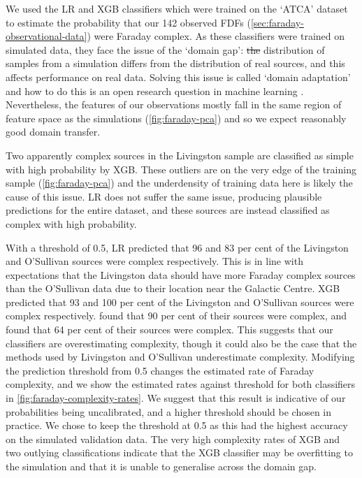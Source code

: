 \documentclass[11pt, a4paper]{book}
\providecommand{\DIFaddtex}[1]{{\protect\color{blue}\uwave{#1}}} %
\providecommand{\DIFdeltex}[1]{{\protect\color{red}\sout{#1}}}                      %
\providecommand{\DIFaddbegin}{} %
\providecommand{\DIFaddend}{} %
\providecommand{\DIFdelbegin}{} %
\providecommand{\DIFdelend}{} %
\providecommand{\DIFadd}[1]{\texorpdfstring{\DIFaddtex{#1}}{#1}} %
\providecommand{\DIFdel}[1]{\texorpdfstring{\DIFdeltex{#1}}{}} %
\newcommand{\DIFscaledelfig}{0.5}
\newlength{\DIFdelgraphicswidth} %
\newlength{\DIFdelgraphicsheight} %
\newcommand{\DIFaddincludegraphics}[2][]{{\color{blue}\fbox{\DIFOincludegraphics[#1]{#2}}}} %
\newcommand{\DIFdelincludegraphics}[2][]{%
\sbox{\DIFdelgraphicsbox}{\DIFOincludegraphics[#1]{#2}}%
\settoboxwidth{\DIFdelgraphicswidth}{\DIFdelgraphicsbox} %
\settoboxtotalheight{\DIFdelgraphicsheight}{\DIFdelgraphicsbox} %
\scalebox{\DIFscaledelfig}{%
\parbox[b]{\DIFdelgraphicswidth}{\usebox{\DIFdelgraphicsbox}\\[-\baselineskip] \rule{\DIFdelgraphicswidth}{0em}}\llap{\resizebox{\DIFdelgraphicswidth}{\DIFdelgraphicsheight}{%
\setlength{\unitlength}{\DIFdelgraphicswidth}%
\begin{picture}(1,1)%
\thicklines\linethickness{2pt} %
{\color[rgb]{1,0,0}\put(0,0){\framebox(1,1){}}}%
{\color[rgb]{1,0,0}\put(0,0){\line( 1,1){1}}}%
{\color[rgb]{1,0,0}\put(0,1){\line(1,-1){1}}}%
\end{picture}%
}\hspace*{3pt}}} %
} %
\DeclareRobustCommand{\DIFaddbegin}{\DIFOaddbegin \let\includegraphics\DIFaddincludegraphics} %
\DeclareRobustCommand{\DIFaddend}{\DIFOaddend \let\includegraphics\DIFOincludegraphics} %
\DeclareRobustCommand{\DIFdelbegin}{\DIFOdelbegin \let\includegraphics\DIFdelincludegraphics} %
\DeclareRobustCommand{\DIFdelend}{\DIFOaddend \let\includegraphics\DIFOincludegraphics} %
\begin{document}
    We used the LR and XGB classifiers which were trained on the `ATCA' dataset to estimate the probability that our 142 observed FDFs (\autoref{sec:faraday-observational-data}) were Faraday complex. As these classifiers were trained on simulated data, they face the issue of the `domain gap': \DIFdelbegin \DIFdel{the }\DIFdelend \DIFaddbegin \DIFadd{The }\DIFaddend distribution of samples from a simulation differs from the distribution of real sources, and this affects performance on real data. Solving this issue is called `domain adaptation' and how to do this is an open research question in machine learning \citep{zhang2019transfer,pan10transfer}. Nevertheless, the features of our observations mostly fall in the same region of feature space as the simulations (\autoref{fig:faraday-pca}) and so we expect reasonably good domain transfer.

    Two apparently complex sources in the Livingston sample are classified as simple with high probability by XGB. These outliers are on the very edge of the training sample (\autoref{fig:faraday-pca}) and the underdensity of training data here is likely the cause of this issue. LR does not suffer the same issue, producing plausible predictions for the entire dataset, and these sources are instead classified as complex with high probability.

    With a threshold of 0.5, LR predicted that 96 and 83 per cent of the Livingston and O'Sullivan sources were complex respectively. This is in line with expectations that the Livingston data should have more Faraday complex sources than the O'Sullivan data due to their location near the Galactic Centre. XGB predicted that 93 and 100 per cent of the Livingston and O'Sullivan sources were complex respectively. \citet{livingston21faraday} found that 90 per cent of their sources were complex, and \citet{osullivan_broad-band_2017} found that 64 per cent of their sources were complex. This suggests that our classifiers are overestimating complexity, though it could also be the case that the methods used by Livingston and O'Sullivan underestimate complexity. Modifying the prediction threshold from 0.5 changes the estimated rate of Faraday complexity, and we show the estimated rates against threshold for both classifiers in \autoref{fig:faraday-complexity-rates}. We suggest that this result is indicative of our probabilities being uncalibrated, and a higher threshold should be chosen in practice. We chose to keep the threshold at 0.5 as this had the highest accuracy on the simulated validation data. The very high complexity rates of XGB and two outlying classifications indicate that the XGB classifier may be overfitting to the simulation and that it is unable to generalise across the domain gap.
\end{document}
